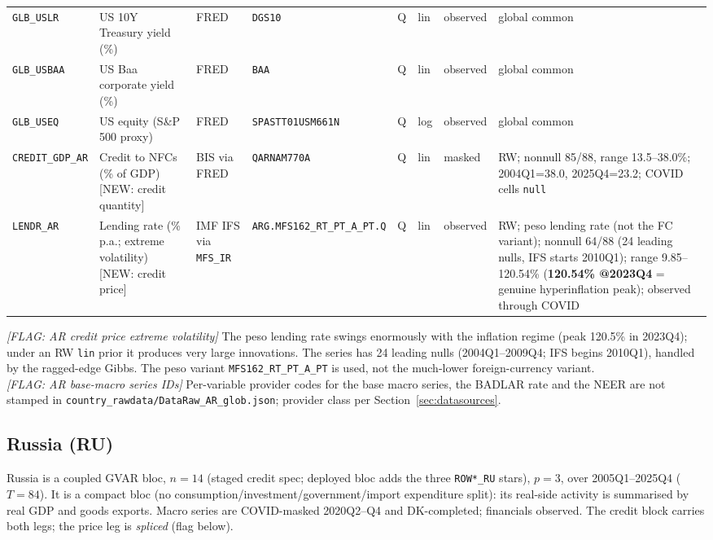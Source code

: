 {\begin{longtable}{p{2.3cm}p{3.3cm}p{2.1cm}p{2.2cm}p{0.6cm}p{1.4cm}p{1.9cm}p{2.4cm}}
\texttt{GLB\_USLR}  & US 10Y Treasury yield (\%)         & FRED & \texttt{DGS10} & Q & lin & observed & global common \\
\texttt{GLB\_USBAA} & US Baa corporate yield (\%)        & FRED & \texttt{BAA} & Q & lin & observed & global common \\
\texttt{GLB\_USEQ}  & US equity (S\&P 500 proxy)         & FRED & \texttt{SPASTT01USM661N} & Q & log & observed & global common \\
\texttt{CREDIT\_GDP\_AR} & Credit to NFCs (\% of GDP) [NEW: credit quantity] & BIS via FRED & \texttt{QARNAM770A} & Q & lin & masked & RW; nonnull 85/88, range 13.5--38.0\%; 2004Q1=38.0, 2025Q4=23.2; COVID cells \texttt{null} \\
\texttt{LENDR\_AR}  & Lending rate (\% p.a.; extreme volatility) [NEW: credit price] & IMF IFS via \texttt{MFS\_IR} & \texttt{ARG.\allowbreak MFS162\_RT\_PT\_A\_PT.\allowbreak Q} & Q & lin & observed & RW; peso lending rate (not the FC variant); nonnull 64/88 (24 leading nulls, IFS starts 2010Q1); range 9.85--120.54\% (\textbf{120.54\% @2023Q4} = genuine hyperinflation peak); observed through COVID \\
\end{longtable}}

\noindent\textit{[FLAG: AR credit price extreme volatility]} The peso lending
rate swings enormously with the inflation regime (peak 120.5\% in 2023Q4); under
an RW \texttt{lin} prior it produces very large innovations. The series has 24
leading nulls (2004Q1--2009Q4; IFS begins 2010Q1), handled by the ragged-edge
Gibbs. The peso variant \texttt{MFS162\_RT\_PT\_A\_PT} is used, not the
much-lower foreign-currency variant.\\
\textit{[FLAG: AR base-macro series IDs]} Per-variable provider codes for the
base macro series, the BADLAR rate and the NEER are not stamped in
\texttt{country\_rawdata/DataRaw\_AR\_glob.json}; provider class per
Section~\ref{sec:datasources}.

\subsection{Russia (RU)}\label{sec:data:RU}

Russia is a coupled GVAR bloc, $n=14$ (staged credit spec; deployed bloc adds
the three \texttt{ROW*\_RU} stars), $p=3$, over 2005Q1--2025Q4 ($T=84$). It is a
compact bloc (no consumption/investment/government/import expenditure split):
its real-side activity is summarised by real GDP and goods exports. Macro series
are COVID-masked 2020Q2--Q4 and DK-completed; financials observed. The credit
block carries both legs; the price leg is \emph{spliced} (flag below).

